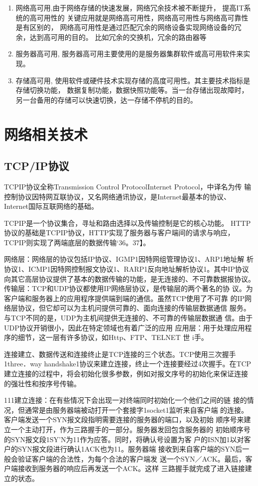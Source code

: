 \noindent
\begin{enumerate}
	\item 网络高可用,由于网络存储的快速发展，网络冗余技术被不断提升，
	提高IT系统的高可用性的
	关键应用就是网络高可用性，网络高可用性与网络高可靠性是有区别的，
	网络高可用性是通过匹配冗余的网络设备实现网络设备的冗余，达到高可用的目的。
	比如冗余的交换机，冗余的路由器等
	\item 服务器高可用,
	服务器高可用主要使用的是服务器集群软件或高可用软件来实现。
	\item 存储高可用,
	使用软件或硬件技术实现存储的高度可用性。其主要技术指标是存储切换功能，
	数据复制功能，数据快照功能等。当一台存储出现故障时，
	另一台备用的存储可以快速切换，达一存储不停机的目的。
\end{enumerate}
\section{网络相关技术}
\subsection{TCP/IP协议}
TCPIP协议全称Transmission Control ProtocolInternet Protocol，中译名为传
输控制协议因特网互联协议，又名网络通讯协议，是Internet最基本的协议、
Internet国际互联网络的基础。

TCPIP是一个协议集合，寻址和路由选择以及传输控制是它的核心功能。
HTTP协议的基础是TCPIP协议，HTTP实现了服务器与客户端间的请求与响应，
TCPIP则实现了两端底层的数据传输‘36。37】。

网络层：网络层的协议包括IP协议、IGMP1因特网组管理协议1、ARP1地址解
析协议1、ICMP1因特网控制报文协议1、RARP1反向地址解析协议1。其中IP协议
向其它高层协议提供了基本的数据传输的功能，是无连接的、不可靠数据报协议。
传输层：TCP和UDP协议都使用IP网络层协议，是传输层的两个著名的协
议。为客户端和服务器上的应用程序提供端到端的通信。虽然TCP使用了不可靠
的IP网络层协议，但它却可以为主机问提供可靠的、面向连接的传输层数据通信
服务。与TCP不同的是，UDP为主机间提供无连接的、不可靠的传输层数据通
信。由于UDP协议开销很小，因此在特定领域也有着广泛的应用
应用层：用于处理应用程序的细节，这一层有许多协议，如Http、FTP、TELNET
世
i手。

连接建立、数据传送和连接终止是TCP连接的三个状态。TCP使用三次握手
1three．way handshake1协议来建立连接，终止一个连接要经过4次握手。在TCP
建立连接的过程中，将会初始化很多参数，例如对报文序号的初始化来保证连接
的强壮性和按序号传输。

111建立连接：在有些情况下会出现一对终端同时初始化一个他们之间的链
接的情况，但通常是由服务器端被动打开一个套接字1socket1监听来自客户端
的连接。客户端发送一个SYN报文段指明需要连接的服务器的端口，以及初始
顺序号来建立一个主动打开，作为三路握手的一部分。服务器发回包含服务器的
初始顺序号的SYN报文段1SY'N为11作为应答。同时，将确认号设置为客
户的ISN加1以对客户的SYN报文段进行确认1ACK也为11。服务器端
接收到来自客户端的SYN后一般会验证客户端的合法性，为每个合法的客户端发
送一个SYN／ACK。最后，客户端接收到服务器的响应后再发送一个ACK。这样
三路握手就完成了进入链接建立的状态。

